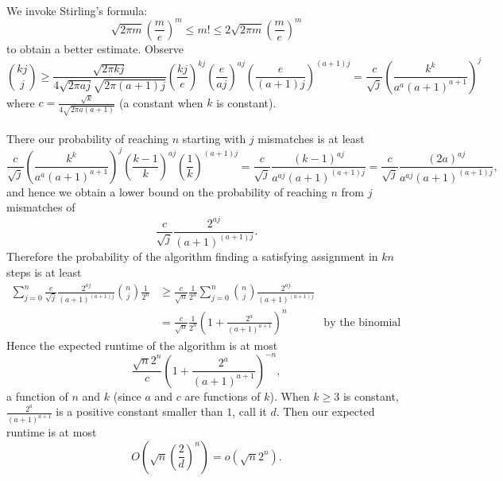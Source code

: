 \documentclass[letterpaper,12pt,oneside,onecolumn]{article}
\begin{document}
\paragraph{}
We invoke Stirling's formula:
$$\sqrt{2\pi m}(\frac{m}{e})^m \leq m! \leq 2\sqrt{2\pi m}(\frac{m}{e})^m$$
to obtain a better estimate. Observe
$${kj\choose j} \geq \frac{\sqrt{2\pi kj}}{4\sqrt{2\pi aj}\sqrt{2\pi (a+1)j}}(\frac{kj}{e})^{kj}(\frac{e}{aj})^{aj}(\frac{e}{(a+1)j})^{(a+1)j} = \frac{c}{\sqrt{j}}(\frac{k^k}{a^a(a+1)^{a+1}})^j$$
where $c = \frac{\sqrt{k}}{4\sqrt{2\pi a(a+1)}}$ (a constant when $k$ is constant).
\paragraph{}
There our probability of reaching $n$ starting with $j$ mismatches is at least
$$\frac{c}{\sqrt{j}}(\frac{k^k}{a^a(a+1)^{a+1}})^j(\frac{k-1}{k})^{aj}(\frac{1}{k})^{(a+1)j} = \frac{c}{\sqrt{j}}\frac{(k-1)^{aj}}{a^{aj}(a+1)^{(a+1)j}} = \frac{c}{\sqrt{j}}\frac{(2a)^{aj}}{a^{aj}(a+1)^{(a+1)j}},$$
and hence we obtain a lower bound on the probability of reaching $n$ from $j$ mismatches of
$$\frac{c}{\sqrt{j}}\frac{2^{aj}}{(a+1)^{(a+1)j}}.$$
Therefore the probability of the algorithm finding a satisfying assignment in $kn$ steps is at least
\begin{align*}
\sum_{j=0}^n\frac{c}{\sqrt{j}}\frac{2^{aj}}{(a+1)^{(a+1)j}} {n\choose j}\frac{1}{2^n} &\geq \frac{c}{\sqrt{n}}\frac{1}{2^n}\sum_{j=0}^n{n\choose j}\frac{2^{aj}}{(a+1)^{(a+1)j}} \\
&=\frac{c}{\sqrt{n}}\frac{1}{2^n}(1+\frac{2^a}{(a+1)^{a+1}})^n &\text{by the binomial theorem}
\end{align*}
Hence the expected runtime of the algorithm is at most
$$\frac{\sqrt{n}2^n}{c}(1+\frac{2^a}{(a+1)^{a+1}})^{-n},$$
a function of $n$ and $k$ (since $a$ and $c$ are functions of $k$). When $k\geq 3$ is constant, $\frac{2^a}{(a+1)^{a+1}}$ is a positive constant smaller than $1$, call it $d$. Then our expected runtime is at most
$$O(\sqrt{n}(\frac{2}{d})^n) = o(\sqrt{n}2^n).$$
\newpage
\section{}

\newpage
\section{}

\newpage
\section{}

\newpage
\section{}
\end{document}
